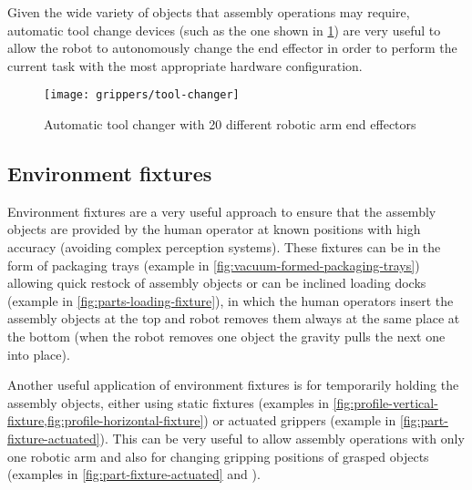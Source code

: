 Given the wide variety of objects that assembly operations may require, automatic tool change devices (such as the one shown in \cref{fig:tool-changer}) are very useful to allow the robot to autonomously change the end effector in order to perform the current task with the most appropriate hardware configuration.

\begin{figure}[H]
	\centering
	\texttt{[image: grippers/tool-changer]}
	\caption[Automatic tool changer with 20 different robotic arm end effectors]{Automatic tool changer with 20 different robotic arm end effectors\protect\footnotemark}
	\label{fig:tool-changer}
\end{figure}


\subsection{Environment fixtures}

Environment fixtures are a very useful approach to ensure that the assembly objects are provided by the human operator at known positions with high accuracy (avoiding complex perception systems). These fixtures can be in the form of packaging trays (example in \cref{fig:vacuum-formed-packaging-trays}) allowing quick restock of assembly objects or can be inclined loading docks (example in \cref{fig:parts-loading-fixture}), in which the human operators insert the assembly objects at the top and robot removes them always at the same place at the bottom (when the robot removes one object the gravity pulls the next one into place).

Another useful application of environment fixtures is for temporarily holding the assembly objects, either using static fixtures (examples in \cref{fig:profile-vertical-fixture,fig:profile-horizontal-fixture}) or actuated grippers (example in \cref{fig:part-fixture-actuated}). This can be very useful to allow assembly operations with only one robotic arm and also for changing gripping positions of grasped objects (examples in \cref{fig:part-fixture-actuated} and \cite{Chavan2015}).


